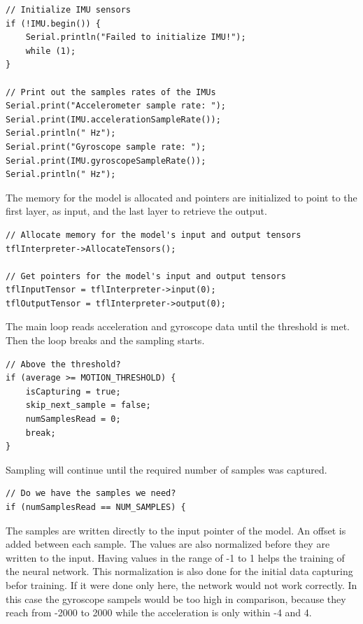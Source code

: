 \documentclass[a4paper,titlepage]{article}
\begin{document}
\begin{lstlisting}
// Initialize IMU sensors
if (!IMU.begin()) {
    Serial.println("Failed to initialize IMU!");
    while (1);
}

// Print out the samples rates of the IMUs
Serial.print("Accelerometer sample rate: ");
Serial.print(IMU.accelerationSampleRate());
Serial.println(" Hz");
Serial.print("Gyroscope sample rate: ");
Serial.print(IMU.gyroscopeSampleRate());
Serial.println(" Hz");
\end{lstlisting}

The memory for the model is allocated and pointers are initialized to point to the first layer, as input, and the last layer to retrieve the output.

\begin{lstlisting}
// Allocate memory for the model's input and output tensors
tflInterpreter->AllocateTensors();

// Get pointers for the model's input and output tensors
tflInputTensor = tflInterpreter->input(0);
tflOutputTensor = tflInterpreter->output(0);
\end{lstlisting}

The main loop reads acceleration and gyroscope data until the threshold is met.
Then the loop breaks and the sampling starts.

\begin{lstlisting}
// Above the threshold?
if (average >= MOTION_THRESHOLD) {
    isCapturing = true;
    skip_next_sample = false;
    numSamplesRead = 0;
    break;
}
\end{lstlisting}

Sampling will continue until the required number of samples was captured.

\begin{lstlisting}
// Do we have the samples we need?
if (numSamplesRead == NUM_SAMPLES) {
\end{lstlisting}

The samples are written directly to the input pointer of the model.
An offset is added between each sample.
The values are also normalized before they are written to the input.
Having values in the range of -1 to 1 helps the training of the neural network.
This normalization is also done for the initial data capturing befor training.
If it were done only here, the network would not work correctly.
In this case the gyroscope sampels would be too high in comparison, because they reach from -2000 to 2000 while the acceleration is only within -4 and 4.
\end{document}
